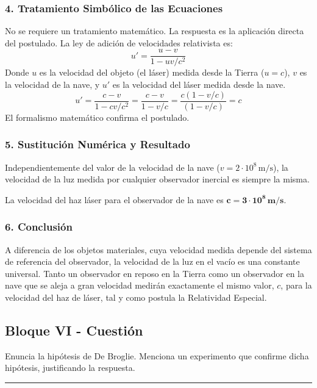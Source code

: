 \subsubsection*{4. Tratamiento Simbólico de las Ecuaciones}
No se requiere un tratamiento matemático. La respuesta es la aplicación directa del postulado.
La ley de adición de velocidades relativista es:
$$ u' = \frac{u-v}{1-uv/c^2} $$
Donde $u$ es la velocidad del objeto (el láser) medida desde la Tierra ($u=c$), $v$ es la velocidad de la nave, y $u'$ es la velocidad del láser medida desde la nave.
$$ u' = \frac{c-v}{1-cv/c^2} = \frac{c-v}{1-v/c} = \frac{c(1-v/c)}{(1-v/c)} = c $$
El formalismo matemático confirma el postulado.

\subsubsection*{5. Sustitución Numérica y Resultado}
Independientemente del valor de la velocidad de la nave ($v=2 \cdot 10^8\,\text{m/s}$), la velocidad de la luz medida por cualquier observador inercial es siempre la misma.
\begin{cajaresultado}
La velocidad del haz láser para el observador de la nave es $\boldsymbol{c = 3 \cdot 10^8\,\textbf{m/s}}$.
\end{cajaresultado}

\subsubsection*{6. Conclusión}
\begin{cajaconclusion}
A diferencia de los objetos materiales, cuya velocidad medida depende del sistema de referencia del observador, la velocidad de la luz en el vacío es una constante universal. Tanto un observador en reposo en la Tierra como un observador en la nave que se aleja a gran velocidad medirán exactamente el mismo valor, $c$, para la velocidad del haz de láser, tal y como postula la Relatividad Especial.
\end{cajaconclusion}

\newpage

\subsection{Bloque VI - Cuestión}
\label{subsec:B6_2013_jul_ext}

\begin{cajaenunciado}
Enuncia la hipótesis de De Broglie. Menciona un experimento que confirme dicha hipótesis, justificando la respuesta.
\end{cajaenunciado}
\hrule

